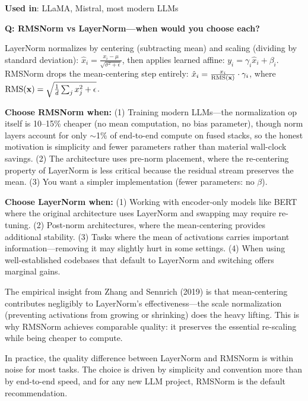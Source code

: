 \textbf{Used in}: LLaMA, Mistral, most modern LLMs


\begin{interviewq}
\textbf{Q: RMSNorm vs LayerNorm---when would you choose each?}

 \quad {} \quad \badgefreq{\freqmed}

\stronganswer

LayerNorm normalizes by centering (subtracting mean) and scaling (dividing by standard deviation): $\hat{x}_i = \frac{x_i - \mu}{\sqrt{\sigma^2 + \epsilon}}$, then applies learned affine: $y_i = \gamma_i \hat{x}_i + \beta_i$. RMSNorm drops the mean-centering step entirely: $\hat{x}_i = \frac{x_i}{\text{RMS}(\mathbf{x})} \cdot \gamma_i$, where $\text{RMS}(\mathbf{x}) = \sqrt{\frac{1}{d}\sum_j x_j^2 + \epsilon}$.

\textbf{Choose RMSNorm when:} (1) Training modern LLMs---the normalization op itself is 10--15\% cheaper (no mean computation, no bias parameter), though norm layers account for only $\sim$1\% of end-to-end compute on fused stacks, so the honest motivation is simplicity and fewer parameters rather than material wall-clock savings. (2) The architecture uses pre-norm placement, where the re-centering property of LayerNorm is less critical because the residual stream preserves the mean. (3) You want a simpler implementation (fewer parameters: no $\beta$).

\textbf{Choose LayerNorm when:} (1) Working with encoder-only models like BERT where the original architecture uses LayerNorm and swapping may require re-tuning. (2) Post-norm architectures, where the mean-centering provides additional stability. (3) Tasks where the mean of activations carries important information---removing it may slightly hurt in some settings. (4) When using well-established codebases that default to LayerNorm and switching offers marginal gains.

The empirical insight from Zhang and Sennrich (2019) is that mean-centering contributes negligibly to LayerNorm's effectiveness---the scale normalization (preventing activations from growing or shrinking) does the heavy lifting. This is why RMSNorm achieves comparable quality: it preserves the essential re-scaling while being cheaper to compute.

In practice, the quality difference between LayerNorm and RMSNorm is within noise for most tasks. The choice is driven by simplicity and convention more than by end-to-end speed, and for any new LLM project, RMSNorm is the default recommendation.


\end{interviewq}
